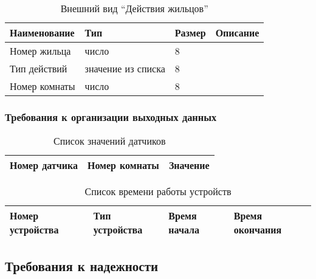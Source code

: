           \begin{table}[h!]
            \centering
            \caption{Внешний вид “Действия жильцов”}
            \label{room:size}
            \begin{tabular}{|l|l|l|l|}
            \hline
            Наименование & Тип & Размер & Описание \\ \hline
            Номер жильца & число & 8 & \\ \hline
            Тип действий & значение из списка & 8 & \\ \hline
            Номер комнаты & число & 8 & \\ \hline
            \end{tabular}
          \end{table} 
    \subsubsection{Требования к организации выходных данных}
      \begin{table}[H]
      \centering
      \caption{Список значений датчиков}
      \label{sensor:statistic}
      \begin{tabular}{|l|l|l|}
      \hline
      Номер датчика & Номер комнаты & Значение \\ \hline
      \end{tabular}
      \end{table}
      
      \begin{table}[H]
      \centering
      \caption{Список времени работы устройств}
      \label{device:statistic}
      \begin{tabular}{|l|l|l|l|}
      \hline
      Номер устройства & Тип устройства & Время начала & Время окончания \\ \hline
      \end{tabular}
      \end{table}
  \subsection{Требования к надежности}
